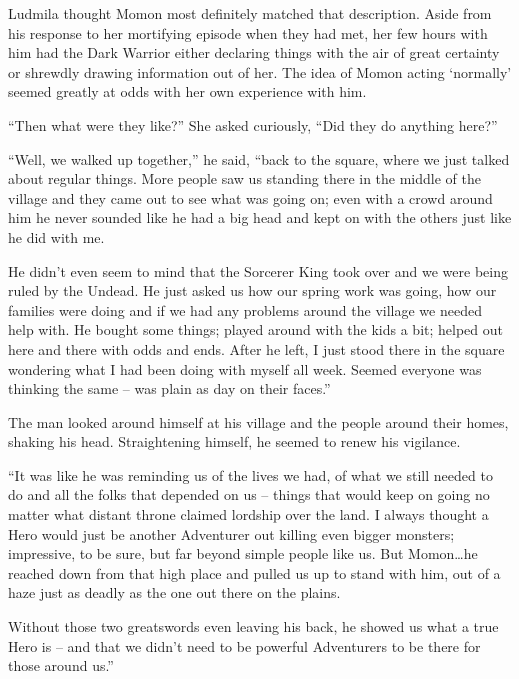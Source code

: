  

Ludmila thought Momon most definitely matched that description. Aside from his response to her mortifying episode when they had met, her few hours with him had the Dark Warrior either declaring things with the air of great certainty or shrewdly drawing information out of her. The idea of Momon acting ‘normally’ seemed greatly at odds with her own experience with him.

 

“Then what were they like?” She asked curiously, “Did they do anything here?”

 

“Well, we walked up together,” he said, “back to the square, where we just talked about regular things. More people saw us standing there in the middle of the village and they came out to see what was going on; even with a crowd around him he never sounded like he had a big head and kept on with the others just like he did with me.

 

He didn’t even seem to mind that the Sorcerer King took over and we were being ruled by the Undead. He just asked us how our spring work was going, how our families were doing and if we had any problems around the village we needed help with. He bought some things; played around with the kids a bit; helped out here and there with odds and ends. After he left, I just stood there in the square wondering what I had been doing with myself all week. Seemed everyone was thinking the same – was plain as day on their faces.”

 

The man looked around himself at his village and the people around their homes, shaking his head. Straightening himself, he seemed to renew his vigilance.

 

“It was like he was reminding us of the lives we had, of what we still needed to do and all the folks that depended on us – things that would keep on going no matter what distant throne claimed lordship over the land. I always thought a Hero would just be another Adventurer out killing even bigger monsters; impressive, to be sure, but far beyond simple people like us. But Momon…he reached down from that high place and pulled us up to stand with him, out of a haze just as deadly as the one out there on the plains.

 

Without those two greatswords even leaving his back, he showed us what a true Hero is – and that we didn’t need to be powerful Adventurers to be there for those around us.”

